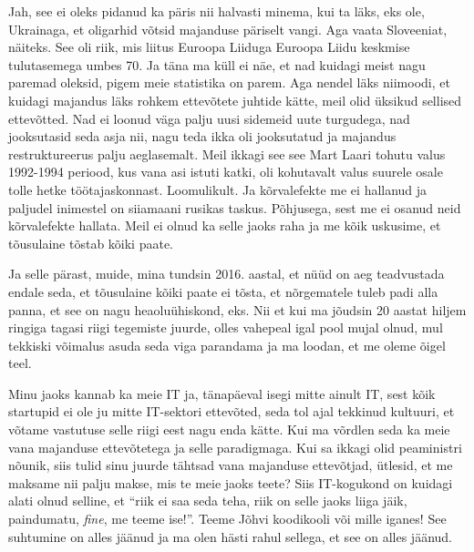 
Jah, see ei oleks pidanud ka päris nii halvasti minema, kui ta läks, eks ole, 
Ukrainaga, et oligarhid võtsid majanduse päriselt vangi. Aga vaata Sloveeniat, 
näiteks. See oli riik, mis liitus Euroopa Liiduga Euroopa Liidu keskmise 
tulutasemega umbes 70. Ja täna ma küll ei näe, et nad kuidagi meist nagu 
paremad oleksid, pigem meie statistika on parem. Aga nendel läks niimoodi, et 
kuidagi majandus läks rohkem ettevõtete juhtide kätte, meil olid üksikud 
sellised ettevõtted. Nad ei loonud  väga palju uusi sidemeid uute turgudega, 
nad jooksutasid seda asja nii, nagu teda ikka oli jooksutatud ja majandus 
restruktureerus palju aeglasemalt. Meil ikkagi see see Mart Laari tohutu valus 
1992-1994 periood, kus vana asi istuti katki, oli kohutavalt valus suurele 
osale tolle hetke töötajaskonnast. Loomulikult. Ja kõrvalefekte me ei hallanud 
ja paljudel inimestel on siiamaani rusikas taskus. Põhjusega, sest me ei osanud 
neid kõrvalefekte hallata. Meil ei olnud ka selle jaoks raha ja me kõik 
uskusime, et tõusulaine tõstab kõiki paate.

Ja selle pärast, muide, mina tundsin 2016. aastal, et nüüd on aeg teadvustada 
endale seda, et tõusulaine kõiki paate ei tõsta, et nõrgematele tuleb padi alla 
panna, et see on nagu heaoluühiskond, eks. Nii et kui ma jõudsin 20 aastat 
hiljem ringiga tagasi riigi tegemiste juurde, olles vahepeal igal pool mujal 
olnud, mul tekkiski võimalus asuda seda viga parandama ja ma loodan, et me 
oleme õigel teel.


Minu jaoks kannab ka meie IT ja,  tänapäeval isegi mitte ainult IT, sest kõik 
startupid ei ole ju mitte IT-sektori ettevõted, seda tol ajal tekkinud 
kultuuri, et võtame vastutuse selle riigi eest nagu enda kätte. Kui ma võrdlen 
seda ka meie vana majanduse ettevõtetega ja selle paradigmaga. Kui sa ikkagi 
olid peaministri nõunik, siis tulid sinu juurde tähtsad vana majanduse 
ettevõtjad, ütlesid, et me maksame nii palju makse, mis te meie jaoks teete? 
Siis IT-kogukond on kuidagi alati  olnud selline, et \enquote{riik ei saa seda 
teha, riik on selle jaoks liiga jäik, paindumatu, \emph{fine}, me teeme ise!}. 
Teeme Jõhvi koodikooli või mille iganes! See suhtumine on alles jäänud ja ma 
olen hästi rahul sellega, et see on alles jäänud. 

